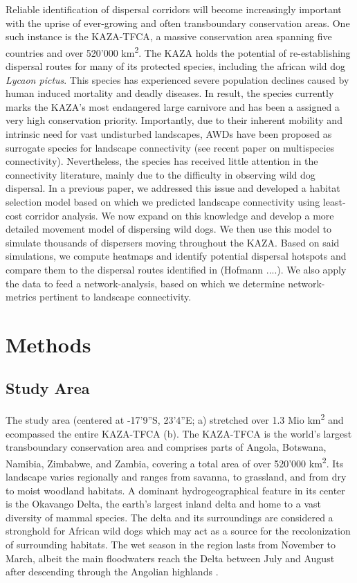 \documentclass[abstract=on,10pt,a4paper,bibliography=totocnumbered]{article}
\begin{document}
Reliable identification of dispersal corridors will become increasingly
important with the uprise of ever-growing and often transboundary conservation
areas. One such instance is the KAZA-TFCA, a massive conservation area spanning
five countries and over 520'000 km\textsuperscript{2}. The KAZA holds the
potential of re-establishing dispersal routes for many of its protected species,
including the african wild dog \textit{Lycaon pictus}. This species has
experienced severe population declines caused by human induced mortality and
deadly diseases. In result, the species currently marks the KAZA's most
endangered large carnivore and has been a assigned a very high conservation
priority. Importantly, due to their inherent mobility and intrinsic need for
vast undisturbed landscapes, AWDs have been proposed as surrogate species for
landscape connectivity (see recent paper on multispecies connectivity).
Nevertheless, the species has received little attention in the connectivity
literature, mainly due to the difficulty in observing wild dog dispersal. In a
previous paper, we addressed this issue and developed a habitat selection model
based on which we predicted landscape connectivity using least-cost corridor
analysis. We now expand on this knowledge and develop a more detailed movement
model of dispersing wild dogs. We then use this model to simulate thousands of
dispersers moving throughout the KAZA. Based on said simulations, we compute
heatmaps and identify potential dispersal hotspots and compare them to the
dispersal routes identified in (Hofmann ....). We also apply the data to feed a
network-analysis, based on which we determine network-metrics pertinent to
landscape connectivity.

\section{Methods}
\subsection{Study Area}
The study area (centered at -17'9''S, 23'4''E;
a) stretched over 1.3 Mio km\textsuperscript{2} and ecompassed
the entire KAZA-TFCA (b). The KAZA-TFCA is the world's largest
transboundary conservation area and comprises parts of Angola, Botswana,
Namibia, Zimbabwe, and Zambia, covering a total area of over 520'000
km\textsuperscript{2}. Its landscape varies regionally and ranges from savanna,
to grassland, and from dry to moist woodland habitats. A dominant
hydrogeographical feature in its center is the Okavango Delta, the earth's
largest inland delta and home to a vast diversity of mammal species. The delta
and its surroundings are considered a stronghold for African wild dogs which may
act as a source for the recolonization of surrounding habitats. The wet season
in the region lasts from November to March, albeit the main floodwaters reach
the Delta between July and August after descending through the Angolian
highlands \citep{McNutt.1996, Wolski.2017}.
\end{document}
